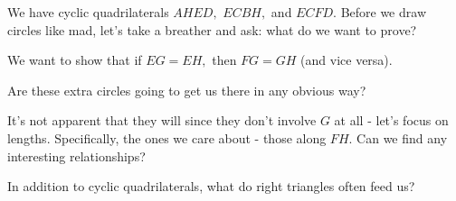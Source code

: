 

We have cyclic quadrilaterals $AHED,$ $ECBH,$ and $ECFD. $ Before we draw circles like mad, let's take a breather and ask: what do we want to prove?



We want to show that if $EG = EH,$ then $FG = GH$ (and vice versa).

Are these extra circles going to get us there in any obvious way?





It's not apparent that they will since they don't involve $G$ at all - let's focus on lengths. Specifically, the ones we care about - those along $FH. $ Can we find any interesting relationships?

In addition to cyclic quadrilaterals, what do right triangles often feed us?







